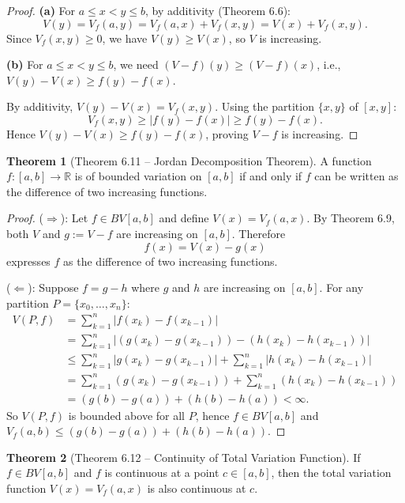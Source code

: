 \documentclass[12pt,a4paper]{article}
\theoremstyle{definition}
\newtheorem{theorem}{Theorem}[section]
\newcommand{\R}{\mathbb{R}}
\begin{document}
\begin{proof}
\textbf{(a)} For $a \leq x < y \leq b$, by additivity (Theorem 6.6):
\[
    V(y) = V_f(a,y) = V_f(a,x) + V_f(x,y) = V(x) + V_f(x,y).
\]
Since $V_f(x,y) \geq 0$, we have $V(y) \geq V(x)$, so $V$ is increasing.

\textbf{(b)} For $a \leq x < y \leq b$, we need $(V-f)(y) \geq (V-f)(x)$, i.e., $V(y) - V(x) \geq f(y) - f(x)$.

By additivity, $V(y) - V(x) = V_f(x,y)$. Using the partition $\{x, y\}$ of $[x,y]$:
\[
    V_f(x,y) \geq |f(y) - f(x)| \geq f(y) - f(x).
\]
Hence $V(y) - V(x) \geq f(y) - f(x)$, proving $V - f$ is increasing.
\end{proof}

\begin{theorem}[Theorem 6.11 -- Jordan Decomposition Theorem]
A function $f: [a,b] \to \R$ is of bounded variation on $[a,b]$ if and only if $f$ can be written as the difference of two increasing functions.
\end{theorem}

\begin{proof}
($\Rightarrow$): Let $f \in BV[a,b]$ and define $V(x) = V_f(a,x)$. By Theorem 6.9, both $V$ and $g := V - f$ are increasing on $[a,b]$. Therefore
\[
    f(x) = V(x) - g(x)
\]
expresses $f$ as the difference of two increasing functions.

\medskip
($\Leftarrow$): Suppose $f = g - h$ where $g$ and $h$ are increasing on $[a,b]$. For any partition $P = \{x_0, \ldots, x_n\}$:
\begin{align*}
    V(P, f) &= \sum_{k=1}^n |f(x_k) - f(x_{k-1})| \\
    &= \sum_{k=1}^n |(g(x_k) - g(x_{k-1})) - (h(x_k) - h(x_{k-1}))| \\
    &\leq \sum_{k=1}^n |g(x_k) - g(x_{k-1})| + \sum_{k=1}^n |h(x_k) - h(x_{k-1})| \\
    &= \sum_{k=1}^n (g(x_k) - g(x_{k-1})) + \sum_{k=1}^n (h(x_k) - h(x_{k-1})) \\
    &= (g(b) - g(a)) + (h(b) - h(a)) < \infty.
\end{align*}
So $V(P,f)$ is bounded above for all $P$, hence $f \in BV[a,b]$ and $V_f(a,b) \leq (g(b)-g(a))+(h(b)-h(a))$.
\end{proof}

\begin{theorem}[Theorem 6.12 -- Continuity of Total Variation Function]
If $f \in BV[a,b]$ and $f$ is continuous at a point $c \in [a,b]$, then the total variation function $V(x) = V_f(a,x)$ is also continuous at $c$.
\end{theorem}
\end{document}
